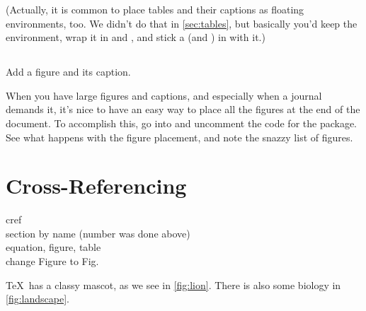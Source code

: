 \documentclass{article}
\begin{document}
(Actually, it is common to place tables and their captions as floating environments, too.
We didn't do that in \cref{sec:tables}, but basically you'd keep the  environment, wrap it in  and , and stick a \latexcode{\\caption} (and \latexcode{\\label}) in with it.)

\subsection*{\task}

Add a figure and its caption.

When you have large figures and captions, and especially when a journal demands it, it's nice to have an easy way to place all the figures at the end of the document.
To accomplish this, go into  and uncomment the code for the  package.
See what happens with the figure placement, and note the snazzy list of figures.

\section{Cross-Referencing}
\label{sec:refs}

cref \\
section by name (number was done above) \\
equation, figure, table \\
change Figure to Fig.

\TeX\ has a classy mascot, as we see in \cref{fig:lion}.
There is also some biology in \cref{fig:landscape}.
\end{document}
